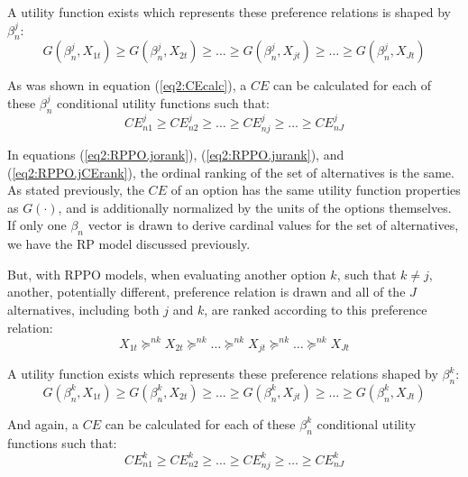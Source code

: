 \documentclass[11pt,a4paper]{report}
\newcommand\CE{\ensuremath{\mathit{CE}}}    %
\begin{document}
\noindent A utility function exists which represents these preference relations is shaped by $\beta_n^j$:
\begin{equation}
	\label{eq2:RPPO.jurank}
	G(\beta_n^j,X_{1t}) \geq G(\beta_n^j,X_{2t}) \geq \ldots \geq G(\beta_n^j,X_{jt}) \geq \ldots \geq G(\beta_n^j,X_{Jt})
\end{equation}

As was shown in equation (\ref{eq2:CEcalc}), a {\CE} can be calculated for each of these $\beta_n^j$ conditional utility functions such that:
\begin{equation}
	\label{eq2:RPPO.jCErank}
	{\CE}^j_{n1} \geq {\CE}^j_{n2} \geq \ldots \geq {\CE}^j_{nj} \geq \ldots \geq {\CE}^j_{nJ}
\end{equation}

In equations (\ref{eq2:RPPO.jorank}), (\ref{eq2:RPPO.jurank}), and (\ref{eq2:RPPO.jCErank}), the ordinal ranking of the set of alternatives is the same.
As stated previously, the {\CE} of an option has the same utility function properties as $G(\cdot)$, and is additionally normalized by the units of the options themselves.
If only one $\beta_n$ vector is drawn to derive cardinal values for the set of alternatives, we have the RP model discussed previously.

But, with RPPO models, when evaluating another option $k$, such that $k \neq j$, another, potentially different, preference relation is drawn and all of the $J$ alternatives, including both $j$ and $k$, are ranked according to this preference relation:
\begin{equation}
	\label{eq2:RPPO.korank}
	X_{1t} \succcurlyeq^{nk} X_{2t} \succcurlyeq^{nk} \ldots \succcurlyeq^{nk} X_{jt} \succcurlyeq^{nk} \ldots \succcurlyeq^{nk} X_{Jt}
\end{equation}

\noindent A utility function exists which represents these preference relations shaped by $\beta_n^k$:
\begin{equation}
	\label{eq2:RPPO.kurank}
	G(\beta_n^k,X_{1t}) \geq G(\beta_n^k,X_{2t}) \geq \ldots \geq G(\beta_n^k,X_{jt}) \geq \ldots \geq G(\beta_n^k,X_{Jt})
\end{equation}

\noindent And again, a {\CE} can be calculated for each of these $\beta_n^k$ conditional utility functions such that:
\begin{equation}
	\label{eq2:RPPO.kCErank}
	{\CE}^k_{n1} \geq {\CE}^k_{n2} \geq \ldots \geq {\CE}^k_{nj} \geq \ldots \geq {\CE}^k_{nJ}
\end{equation}
\end{document}
